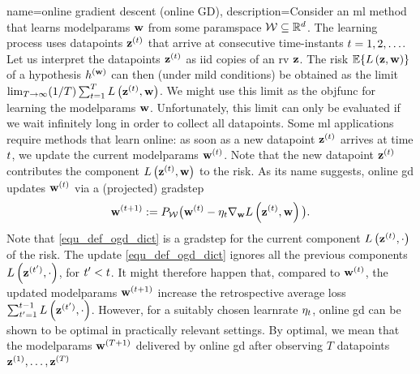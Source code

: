 {name={online gradient descent (online GD)}, 
	description={Consider  an \gls{ml} method that learns \gls{modelparams} 
		${\bf w}$ from some \gls{paramspace} $\mathcal{W} \subseteq \mathbb{R}^{d}$. 
		The learning process uses \gls{datapoint}s ${\bf z}^{(t)}$ that arrive at consecutive time-instants $t=1,2,\ldots$. 
		Let us interpret the \gls{datapoint}s ${\bf z}^{(t)}$ as \gls{iid} copies 
		of an \gls{rv} ${\bf z}$. The \gls{risk} $\mathbb{E}\{ L\left({\bf z},{\bf w} \right) \}$ of a 
		\gls{hypothesis} $h^{({\bf w})}$ can then (under mild conditions) be obtained as the limit 
		$\lim_{T\rightarrow \infty} (1/T)\sum_{t=1}^{T} L\left({\bf z}^{(t)},{\bf w} \right)$. 
		We might use this limit as the \gls{objfunc} for learning the \gls{modelparams} ${\bf w}$. 
		Unfortunately, this limit can only be evaluated if we wait infinitely long in order to collect all \gls{datapoint}s. 
		Some \gls{ml} applications require methods that learn online: as soon as a new \gls{datapoint} ${\bf z}^{(t)}$ 
		arrives at time $t$, we update the current \gls{modelparams} ${\bf w}^{(t)}$. Note that 
		the new \gls{datapoint} ${\bf z}^{(t)}$ contributes the component $L\left({\bf z}^{(t)},{\bf w} \right)$ 
		to the \gls{risk}. As its name suggests, online \gls{gd} updates ${\bf w}^{(t)}$ via a (projected) \gls{gradstep}
		\begin{equation} 
		\label{equ_def_ogd_dict}
 		{\bf w}^{(t+1)} := P_{\mathcal{W}}\big( {\bf w}^{(t)} - \eta_{t} \nabla_{{\bf w}} L\left({\bf z}^{(t)},{\bf w} \right)\big). 
		\end{equation} 
		Note that \eqref{equ_def_ogd_dict} is a \gls{gradstep} for the current component $L\left({\bf z}^{(t)},\cdot \right)$ 
		of the \gls{risk}. The update \eqref{equ_def_ogd_dict} ignores all the previous components $L\left({\bf z}^{(t')},\cdot \right)$, 
		for $t' < t$. It might therefore happen that, compared to ${\bf w}^{(t)}$, the updated \gls{modelparams} 
		${\bf w}^{(t+1)}$ increase the retrospective average \gls{loss} $\sum_{t'=1}^{t-1} L\left({\bf z}^{(t')},\cdot \right)$. 
		However, for a suitably chosen \gls{learnrate} $\eta_{t}$, online \gls{gd} can be shown 
		to be optimal in practically relevant settings. By optimal, we mean that the \gls{modelparams} 
		${\bf w}^{(T+1)}$ delivered by online \gls{gd} after observing $T$ \gls{datapoint}s ${\bf z}^{(1)},\ldots, {\bf z}^{(T)}$ 
}}
